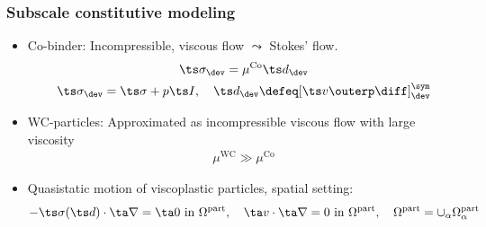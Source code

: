 \documentclass[11pt]{beamer} %
\newcommand{\particle}{\mathrm{part}}
\renewcommand{\alert}[1]{\textbf{#1}}
\begin{document}
\begin{frame}
 \frametitle{Subscale constitutive modeling}
 \begin{itemize}
  \item Co-binder: Incompressible, viscous flow $\leadsto$ Stokes' flow.
  \begin{gather*}
   \ts\sigma_\dev = \mu^{\mathrm{Co}} {\ts d}_\dev\\
   \ts\sigma_\dev = \ts\sigma + p\ts I,\quad \ts d_\dev \defeq [\ts v\outerp \diff]_\dev^\sym
  \end{gather*}
  \item WC-particles: Approximated as incompressible viscous flow with large viscosity
  \begin{align*}
   \mu^{\mathrm{WC}} \gg \mu^{\mathrm{Co}}
  \end{align*}
  \item Quasistatic motion of viscoplastic particles, spatial setting:
  \begin{align*}
   -\ts\sigma(\ts d)\cdot\ta\nabla = \ta 0 \text{ in } \Omega^\particle,\quad \ta v\cdot\ta\nabla = 0 \text{ in } \Omega^\particle,\quad \Omega^\particle = \cup_\alpha \Omega_\alpha^\particle
  \end{align*}
 \end{itemize}
\end{frame}
\end{document}

